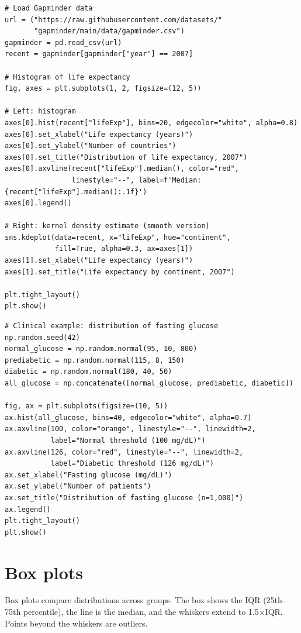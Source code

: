 \begin{verbatim}
# Load Gapminder data
url = ("https://raw.githubusercontent.com/datasets/"
       "gapminder/main/data/gapminder.csv")
gapminder = pd.read_csv(url)
recent = gapminder[gapminder["year"] == 2007]

# Histogram of life expectancy
fig, axes = plt.subplots(1, 2, figsize=(12, 5))

# Left: histogram
axes[0].hist(recent["lifeExp"], bins=20, edgecolor="white", alpha=0.8)
axes[0].set_xlabel("Life expectancy (years)")
axes[0].set_ylabel("Number of countries")
axes[0].set_title("Distribution of life expectancy, 2007")
axes[0].axvline(recent["lifeExp"].median(), color="red",
                linestyle="--", label=f'Median: {recent["lifeExp"].median():.1f}')
axes[0].legend()

# Right: kernel density estimate (smooth version)
sns.kdeplot(data=recent, x="lifeExp", hue="continent",
            fill=True, alpha=0.3, ax=axes[1])
axes[1].set_xlabel("Life expectancy (years)")
axes[1].set_title("Life expectancy by continent, 2007")

plt.tight_layout()
plt.show()
\end{verbatim}

\begin{verbatim}
# Clinical example: distribution of fasting glucose
np.random.seed(42)
normal_glucose = np.random.normal(95, 10, 800)
prediabetic = np.random.normal(115, 8, 150)
diabetic = np.random.normal(180, 40, 50)
all_glucose = np.concatenate([normal_glucose, prediabetic, diabetic])

fig, ax = plt.subplots(figsize=(10, 5))
ax.hist(all_glucose, bins=40, edgecolor="white", alpha=0.7)
ax.axvline(100, color="orange", linestyle="--", linewidth=2,
           label="Normal threshold (100 mg/dL)")
ax.axvline(126, color="red", linestyle="--", linewidth=2,
           label="Diabetic threshold (126 mg/dL)")
ax.set_xlabel("Fasting glucose (mg/dL)")
ax.set_ylabel("Number of patients")
ax.set_title("Distribution of fasting glucose (n=1,000)")
ax.legend()
plt.tight_layout()
plt.show()
\end{verbatim}

\section{Box plots}

Box plots compare distributions across groups. The box shows the IQR (25th--75th percentile), the line is the median, and the whiskers extend to 1.5$\times$IQR. Points beyond the whiskers are outliers.

